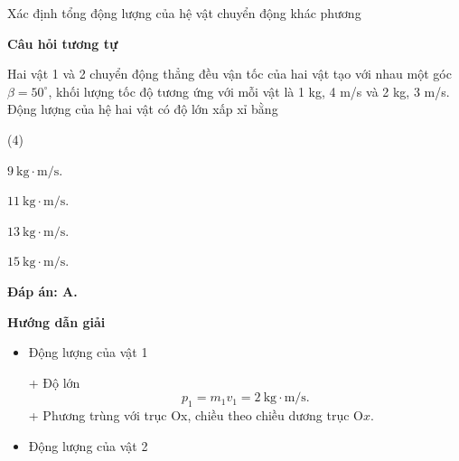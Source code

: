\begin{dang}{Xác định tổng động lượng của hệ vật chuyển động khác phương}
{		\begin{center}
			\textbf{Câu hỏi tương tự}
		\end{center}
		
		Hai vật 1 và 2 chuyển động thẳng đều vận tốc của hai vật tạo với nhau một góc $\beta = 50^\circ$, khối lượng tốc độ tương ứng với mỗi vật là 1 kg, 4 m/s và 2 kg, 3 m/s. Động lượng của hệ hai vật có độ lớn xấp xỉ bằng
		\begin{mcq}(4)
			\item $9\ \text{kg} \cdot \text{m/s}$.	
			\item $11\ \text{kg} \cdot \text{m/s}$.
			\item $13\ \text{kg} \cdot \text{m/s}$.	
			\item $15\ \text{kg} \cdot \text{m/s}$.
		\end{mcq}
		
		\textbf{Đáp án: A.}
	}
	{\begin{center}
			\textbf{Hướng dẫn giải}
		\end{center}
		
		\begin{itemize}
			\item Động lượng của vật 1 
			
			+ Độ lớn
			\begin{equation*}
				p_1=m_1v_1=2\ \text{kg} \cdot \text{m/s}. 
			\end{equation*}
			+ Phương trùng với trục Ox, chiều theo chiều dương trục O$x$.
			\item Động lượng của vật 2
			

\end{itemize}}
\end{dang}
